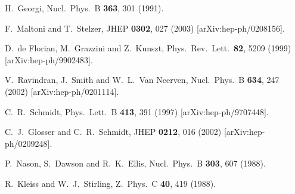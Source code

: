 \documentclass[12pt]{article}
\begin{document}
\begin{thebibliography}{99}
%
H.~Georgi,
Nucl.\ Phys.\ B {\bf 363}, 301 (1991).

F.~Maltoni and T.~Stelzer,
JHEP {\bf 0302}, 027 (2003)
[arXiv:hep-ph/0208156].

D.~de Florian, M.~Grazzini and Z.~Kunszt,
Phys.\ Rev.\ Lett.\  {\bf 82}, 5209 (1999)
[arXiv:hep-ph/9902483].

V.~Ravindran, J.~Smith and W.~L.~Van Neerven,
Nucl.\ Phys.\ B {\bf 634}, 247 (2002)
[arXiv:hep-ph/0201114].

C.~R.~Schmidt,
Phys.\ Lett.\ B {\bf 413}, 391 (1997)
[arXiv:hep-ph/9707448].

C.~J.~Glosser and C.~R.~Schmidt,
JHEP {\bf 0212}, 016 (2002)
[arXiv:hep-ph/0209248].

P.~Nason, S.~Dawson and R.~K.~Ellis,
Nucl.\ Phys.\ B {\bf 303}, 607 (1988).

R.~Kleiss and W.~J.~Stirling,
Z.\ Phys.\ C {\bf 40}, 419 (1988).

\end{thebibliography}
\end{document}
